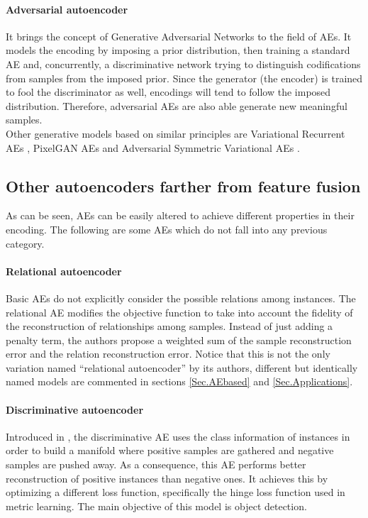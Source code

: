 \documentclass[preprint,5p,compress]{elsarticle}
\begin{document}
\paragraph{Adversarial autoencoder \cite{AdversarialAE}} It brings the concept of Generative Adversarial Networks \cite{GAN} to the field of AEs. It models the encoding by imposing a prior distribution, then training a standard AE and, concurrently, a discriminative network trying to distinguish codifications from samples from the imposed prior. Since the generator (the encoder) is trained to fool the discriminator as well, encodings will tend to follow the imposed distribution. Therefore, adversarial AEs are also able generate new meaningful samples. \\

Other generative models based on similar principles are Variational Recurrent AEs \cite{VRAE}, PixelGAN AEs \cite{PixelGAN} and Adversarial Symmetric Variational AEs \cite{ASVAE}.


\subsection{Other autoencoders farther from feature fusion}\label{Sec.OtherAEs}

As can be seen, AEs can be easily altered to achieve different properties in their encoding. The following are some AEs which do not fall into any previous category.

\paragraph{Relational autoencoder}
Basic AEs do not explicitly consider the possible relations among instances. The relational AE \cite{Meng2017} modifies the objective function to take into account the fidelity of the reconstruction of relationships among samples. Instead of just adding a penalty term, the authors propose a weighted sum of the sample reconstruction error and the relation reconstruction error. Notice that this is not the only variation named ``relational autoencoder'' by its authors, different but identically named models are commented in sections \ref{Sec.AEbased} and \ref{Sec.Applications}.

\paragraph{Discriminative autoencoder} Introduced in \cite{DiscriminativeAE}, the discriminative AE uses the class information of instances in order to build a manifold where positive samples are gathered and negative samples are pushed away. As a consequence, this AE performs better reconstruction of positive instances than negative ones. It achieves this by optimizing a different loss function, specifically the hinge loss function used in metric learning. The main objective of this model is object detection.
\end{document}
